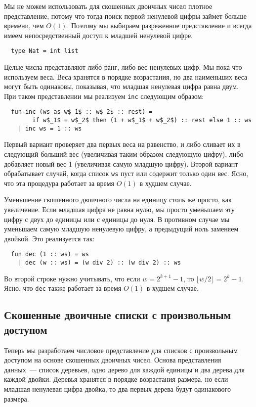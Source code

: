 Мы не можем использовать для скошенных двоичных чисел плотное
представление, потому что тогда поиск первой ненулевой цифры займет
больше времени, чем $O(1)$. Поэтому мы выбираем разреженное
представление и всегда имеем непосредственный доступ к младшей
ненулевой цифре.
\begin{lstlisting}
  type Nat = int list
\end{lstlisting}
Целые числа представляют либо ранг, либо вес ненулевых цифр. Мы пока
что используем веса. Веса хранятся в порядке возрастания, но два
наименьших веса могут быть одинаковы, показывая, что младшая ненулевая
цифра равна двум. При таком представлении мы реализуем \lstinline!inc!
следующим образом:
\begin{lstlisting}
  fun inc (ws as w$_1$ :: w$_2$ :: rest) =
        if w$_1$ = w$_2$ then (1 + w$_1$ + w$_2$) :: rest else 1 :: ws
    | inc ws = 1 :: ws
\end{lstlisting}
Первый вариант проверяет два первых веса на равенство, и либо сливает
их в следующий больший вес (увеличивая таким образом следующую цифру),
либо добавляет новый вес 1 (увеличивая самую младшую цифру). Второй
вариант обрабатывает случай, когда список \lstinline!ws! пуст или
содержит только один вес. Ясно, что эта процедура работает за время
$O(1)$ в худшем случае.

Уменьшение скошенного двоичного числа на единицу столь же просто, как
увеличение. Если младшая цифра не равна нулю, мы просто уменьшаем эту
цифру с двух до единицы или с единицы до нуля. В противном случае мы
уменьшаем самую младшую ненулевую цифру, а предыдущий ноль заменяем
двойкой. Это реализуется так:
\begin{lstlisting}
  fun dec (1 :: ws) = ws
    | dec (w :: ws) = (w div 2) :: (w div 2) :: ws
\end{lstlisting}
Во второй строке нужно учитывать, что если $w = 2^{k+1} - 1$, то
$\lfloor w/2 \rfloor = 2^k - 1$. Ясно, что \lstinline!dec! также
работает за время $O(1)$ в худшем случае.

\subsection{Скошенные двоичные списки с произвольным доступом}
\label{sc:9.3.1}

Теперь мы разработаем числовое представление для списков с
произвольным доступом на основе скошенных двоичных чисел.  Основа
представления данных~--- список деревьев, одно дерево для каждой
единицы и два дерева для каждой двойки. Деревья хранятся в порядке
возрастания размера, но если младшая ненулевая цифра двойка, то два
первых дерева будут одинакового размера.

